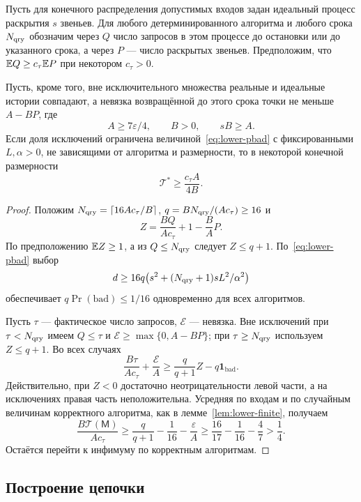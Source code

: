 \begin{lemma}\label{lem:lower-revelations}
Пусть для конечного распределения допустимых входов задан идеальный процесс
раскрытия $s$ звеньев. Для любого детерминированного алгоритма
и любого срока $N_{\rm qry}$ обозначим через $Q$ число запросов
в этом процессе до остановки или до указанного срока, а через $P$ ---
число раскрытых звеньев. Предположим, что
$\mathbb E Q\ge c_\tau\mathbb E P$ при некотором $c_\tau>0$.

Пусть, кроме того, вне исключительного множества реальные и идеальные истории совпадают,
а невязка возвращённой до этого срока точки не меньше $A-BP$, где
\[
 A\ge7\varepsilon/4,\qquad B>0,\qquad sB\ge A.
\]
Если доля исключений ограничена величиной~\eqref{eq:lower-pbad}
с фиксированными $L,\alpha>0$, не зависящими от алгоритма и размерности,
то в некоторой конечной размерности
\[
 \mathcal T^\ast\ge\frac{c_\tau A}{4B}.
\]
\end{lemma}

\begin{proof}
Положим $N_{\rm qry}=\lceil16Ac_\tau/B\rceil$,
$q=BN_{\rm qry}/(Ac_\tau)\ge16$ и
\[
 Z=\frac{BQ}{Ac_\tau}+1-\frac BA P.
\]
По предположению $\mathbb E Z\ge1$, а из $Q\le N_{\rm qry}$ следует $Z\le q+1$.
По~\eqref{eq:lower-pbad} выбор
\[
 d\ge16q\bigl(s^2+(N_{\rm qry}+1)sL^2/\alpha^2\bigr)
\]
обеспечивает $q\Pr(\mathrm{bad})\le1/16$ одновременно для всех алгоритмов.

Пусть $\tau$ --- фактическое число запросов, $\mathcal E$ --- невязка.
Вне исключений при $\tau<N_{\rm qry}$ имеем $Q\le\tau$
и $\mathcal E\ge\max\{0,A-BP\}$; при $\tau\ge N_{\rm qry}$
используем $Z\le q+1$. Во всех случаях
\[
 \frac{B\tau}{Ac_\tau}+\frac{\mathcal E}{A}
 \ge\frac{q}{q+1}Z-q\mathbf1_{\mathrm{bad}}.
\]
Действительно, при $Z<0$ достаточно неотрицательности левой части,
а на исключениях правая часть неположительна.
Усредняя по входам и по случайным величинам корректного алгоритма,
как в лемме~\ref{lem:lower-finite}, получаем
\[
 \frac{B\mathcal T(\mathsf M)}{Ac_\tau}
 \ge\frac{q}{q+1}-\frac1{16}-\frac\varepsilon A
 \ge\frac{16}{17}-\frac1{16}-\frac47>\frac14.
\]
Остаётся перейти к инфимуму по корректным алгоритмам.
\end{proof}

\subsection{Построение цепочки}

